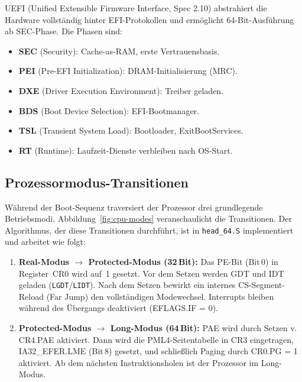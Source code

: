 ﻿\documentclass[a4paper,12pt]{scrreprt}
\theoremstyle{definition}
\begin{document}
	UEFI (Unified Extensible Firmware Interface, Spec 2.10) abstrahiert die
	Hardware vollständig hinter EFI-Protokollen und ermöglicht 64-Bit-Ausführung
	ab SEC-Phase. Die Phasen sind:
	\begin{itemize}
		\item \textbf{SEC} (Security): Cache-as-RAM, erste Vertrauensbasis.
		\item \textbf{PEI} (Pre-EFI Initialization): DRAM-Initialisierung (MRC).
		\item \textbf{DXE} (Driver Execution Environment): Treiber geladen.
		\item \textbf{BDS} (Boot Device Selection): EFI-Bootmanager.
		\item \textbf{TSL} (Transient System Load): Bootloader, ExitBootServices.
		\item \textbf{RT} (Runtime): Laufzeit-Dienste verbleiben nach OS-Start.
	\end{itemize}

	\label{sec:uefi_phases}

	\subsection{Prozessormodus-Transitionen}

	Während der Boot-Sequenz traversiert der Prozessor drei grundlegende
	Betriebsmodi. Abbildung~\ref{fig:cpu-modes} veranschaulicht die
	Transitionen. Der Algorithmus, der diese Transitionen durchführt, ist
	in \texttt{head\_64.S} implementiert und arbeitet wie folgt:

	\begin{enumerate}
		\item \textbf{Real-Modus $\to$ Protected-Modus (32\,Bit):} Das
		PE-Bit (Bit\,0) in Register~CR0 wird auf~1 gesetzt. Vor dem Setzen
		werden GDT und IDT geladen (\texttt{LGDT}/\texttt{LIDT}). Nach dem
		Setzen bewirkt ein internes CS-Segment-Reload (Far Jump) den
		vollständigen Modewechsel. Interrupts bleiben während des Übergangs
		deaktiviert (EFLAGS.IF = 0).
		\item \textbf{Protected-Modus $\to$ Long-Modus (64\,Bit):} PAE wird
		durch Setzen v. CR4.PAE aktiviert. Dann wird die PML4-Seitentabelle
		in CR3 eingetragen, IA32\_EFER.LME (Bit\,8) gesetzt, und
		schließlich Paging durch CR0.PG = 1 aktiviert. Ab dem nächsten
		Instruktionsholen ist der Prozessor im Long-Modus.
	\end{enumerate}
\end{document}
